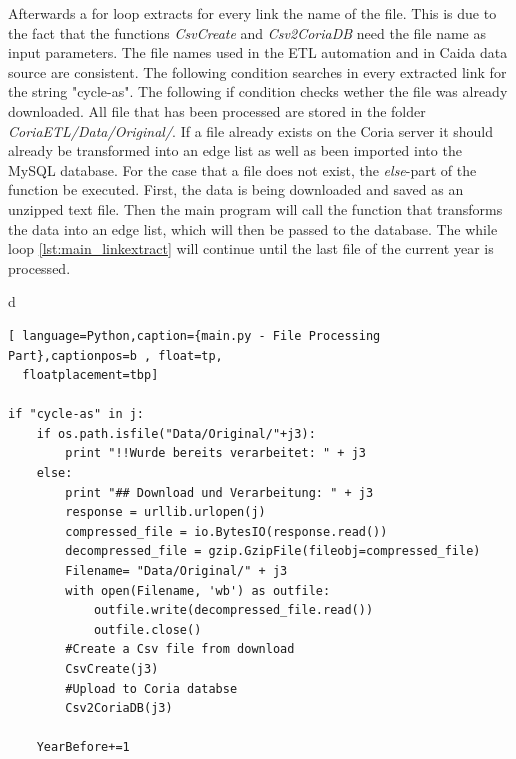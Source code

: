 \documentclass[conference, 11pt]{IEEEtran}
\begin{document}
Afterwards a for loop extracts for every link the name of the file. This is due to the fact that the functions \textit{CsvCreate} and \textit{Csv2CoriaDB} need the file name as input parameters. The file names used in the ETL automation and in Caida data source are consistent. The following condition searches in every extracted link for the string "cycle-as". The following if condition checks wether the file was already downloaded. All file that has been processed are stored in the folder \textit{CoriaETL/Data/Original/}. If a file already exists on the Coria server it should already be transformed into an edge list as well as been imported into the MySQL database. For the case that a file does not exist, the \textit{else}-part of the function be executed. First, the data is being downloaded and saved as an unzipped text file. 
Then the main program will call the function that transforms the data into an edge list, which will then be passed to the database. 
The while loop \ref{lst:main_linkextract} will continue until the last file of the current year is processed.
\linebreak



d



\begin{lstlisting}[ language=Python,caption={main.py - File Processing Part},captionpos=b , float=tp,
  floatplacement=tbp] 

if "cycle-as" in j:
	if os.path.isfile("Data/Original/"+j3):
		print "!!Wurde bereits verarbeitet: " + j3
	else:
		print "## Download und Verarbeitung: " + j3
		response = urllib.urlopen(j)
		compressed_file = io.BytesIO(response.read())
		decompressed_file = gzip.GzipFile(fileobj=compressed_file)
		Filename= "Data/Original/" + j3
		with open(Filename, 'wb') as outfile:
			outfile.write(decompressed_file.read())
			outfile.close()
		#Create a Csv file from download 
		CsvCreate(j3)
		#Upload to Coria databse 
		Csv2CoriaDB(j3)

	YearBefore+=1 

\end{lstlisting}
\end{document}
